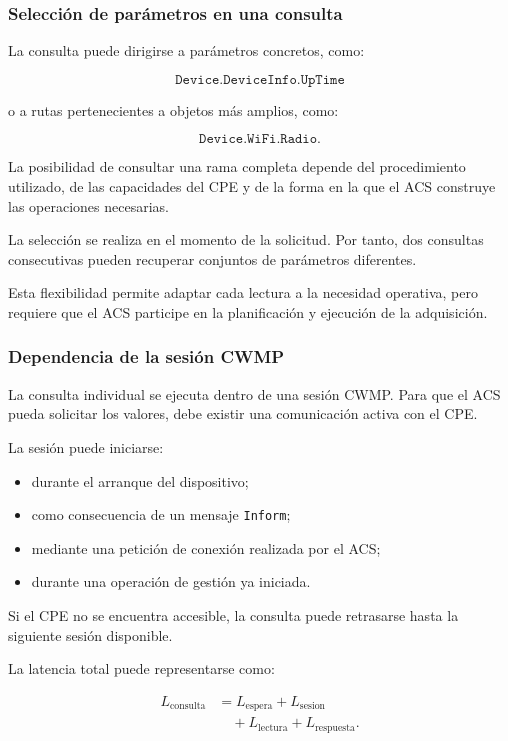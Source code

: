 \subsubsection*{Selección de parámetros en una consulta}

La consulta puede dirigirse a parámetros concretos, como:

\[
    \texttt{Device.DeviceInfo.UpTime}
\]

o a rutas pertenecientes a objetos más amplios, como:

\[
    \texttt{Device.WiFi.Radio.}
\]

La posibilidad de consultar una rama completa depende del procedimiento
utilizado, de las capacidades del CPE y de la forma en la que el ACS
construye las operaciones necesarias.

La selección se realiza en el momento de la solicitud. Por tanto, dos
consultas consecutivas pueden recuperar conjuntos de parámetros
diferentes.

Esta flexibilidad permite adaptar cada lectura a la necesidad operativa,
pero requiere que el ACS participe en la planificación y ejecución de la
adquisición.


\subsubsection*{Dependencia de la sesión CWMP}

La consulta individual se ejecuta dentro de una sesión CWMP. Para que el
ACS pueda solicitar los valores, debe existir una comunicación activa con
el CPE.

La sesión puede iniciarse:

\begin{itemize}
    \item durante el arranque del dispositivo;
    \item como consecuencia de un mensaje \texttt{Inform};
    \item mediante una petición de conexión realizada por el ACS;
    \item durante una operación de gestión ya iniciada.
\end{itemize}

Si el CPE no se encuentra accesible, la consulta puede retrasarse hasta
la siguiente sesión disponible.

La latencia total puede representarse como:

\[
\begin{aligned}
    L_{\mathrm{consulta}}
    &=
    L_{\mathrm{espera}}
    +
    L_{\mathrm{sesion}}\\
    &\quad+
    L_{\mathrm{lectura}}
    +
    L_{\mathrm{respuesta}}.
\end{aligned}
\]

